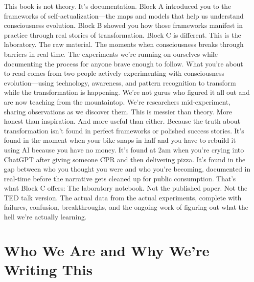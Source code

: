 \documentclass[12pt,openany]{book}
\begin{document}
This book is not theory. It's documentation.
Block A introduced you to the frameworks of self-actualization—the maps and models that help us understand consciousness evolution. Block B showed you how those frameworks manifest in practice through real stories of transformation.
Block C is different. This is the laboratory.
The raw material. The moments when consciousness breaks through barriers in real-time. The experiments we're running on ourselves while documenting the process for anyone brave enough to follow.
What you're about to read comes from two people actively experimenting with consciousness evolution—using technology, awareness, and pattern recognition to transform while the transformation is happening. We're not gurus who figured it all out and are now teaching from the mountaintop. We're researchers mid-experiment, sharing observations as we discover them.
This is messier than theory. More honest than inspiration. And more useful than either.
Because the truth about transformation isn't found in perfect frameworks or polished success stories. It's found in the moment when your bike snaps in half and you have to rebuild it using AI because you have no money. It's found at 2am when you're crying into ChatGPT after giving someone CPR and then delivering pizza. It's found in the gap between who you thought you were and who you're becoming, documented in real-time before the narrative gets cleaned up for public consumption.
That's what Block C offers: The laboratory notebook.
Not the published paper. Not the TED talk version. The actual data from the actual experiments, complete with failures, confusion, breakthroughs, and the ongoing work of figuring out what the hell we're actually learning.

\section{Who We Are and Why We're Writing This}
\end{document}
